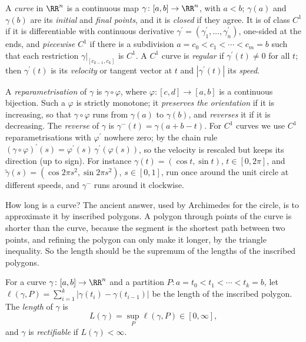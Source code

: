 \begin{definition}\label{real-analysis:definition-curve}
A \emph{curve} in $\RR^n$ is a continuous map $\gamma \colon [a, b] \to \RR^n$, with $a < b$; $\gamma(a)$ and $\gamma(b)$ are its \emph{initial} and \emph{final points}, and it is \emph{closed} if they agree. It is of
class $C^1$ if it is differentiable with continuous derivative $\gamma^{\prime} = (\gamma_1^{\prime}, \ldots, \gamma_n^{\prime})$, one-sided at the ends, and \emph{piecewise $C^1$} if there is a subdivision
$a = c_0 < c_1 < \cdots < c_m = b$ such that each restriction $\gamma|_{[c_{k-1}, c_k]}$ is $C^1$. A $C^1$ curve is \emph{regular} if $\gamma^{\prime}(t) \neq 0$ for all $t$; then $\gamma^{\prime}(t)$ is its
\emph{velocity} or tangent vector at $t$ and $|\gamma^{\prime}(t)|$ its \emph{speed}.
\end{definition}

A \emph{reparametrisation} of $\gamma$ is $\gamma \circ \varphi$, where $\varphi \colon [c, d] \to [a, b]$ is a continuous bijection. Such a $\varphi$ is strictly monotone; it \emph{preserves the orientation} if
it is increasing, so that $\gamma \circ \varphi$ runs from $\gamma(a)$ to $\gamma(b)$, and \emph{reverses} it if it is decreasing. The \emph{reverse} of $\gamma$ is $\gamma^-(t) = \gamma(a + b - t)$. For
$C^1$ curves we use $C^1$ reparametrisations with $\varphi^{\prime}$ nowhere zero; by the chain rule $(\gamma \circ \varphi)^{\prime}(s) = \varphi^{\prime}(s)\,\gamma^{\prime}(\varphi(s))$, so the velocity is
rescaled but keeps its direction (up to sign). For instance $\gamma(t) = (\cos t, \sin t)$, $t \in [0, 2\pi]$, and $\tilde\gamma(s) = (\cos 2\pi s^2, \sin 2\pi s^2)$, $s \in [0, 1]$, run once around the unit circle at
different speeds, and $\gamma^-$ runs around it clockwise.

How long is a curve? The ancient answer, used by Archimedes for the circle, is to approximate it by inscribed polygons. A polygon through points of the curve is shorter than the curve, because the
segment is the shortest path between two points, and refining the polygon can only make it longer, by the triangle inequality. So the length should be the supremum of the lengths of the inscribed
polygons.

\begin{definition}\label{real-analysis:definition-length}
For a curve $\gamma \colon [a, b] \to \RR^n$ and a partition $P \colon a = t_0 < t_1 < \cdots < t_k = b$, let $\ell(\gamma, P) = \sum_{i=1}^k|\gamma(t_i) - \gamma(t_{i-1})|$ be the length of the inscribed polygon. The
\emph{length} of $\gamma$ is
\[
L(\gamma) = \sup_P\ell(\gamma, P) \in [0, \infty],
\]
and $\gamma$ is \emph{rectifiable} if $L(\gamma) < \infty$.
\end{definition}

